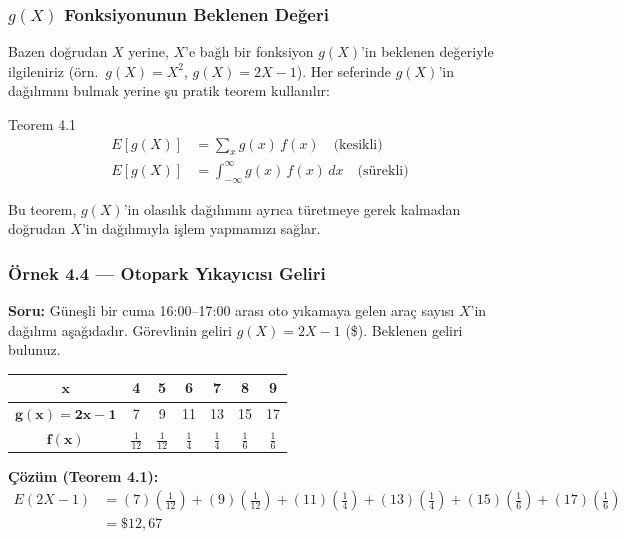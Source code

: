 ﻿\documentclass[light]{lutbeamer}
\begin{document}
\begin{frame}[fragile]
  \frametitle[Teorem 4.1]{$g(X)$ Fonksiyonunun Beklenen Değeri}
  Bazen doğrudan $X$ yerine, $X$'e bağlı bir fonksiyon $g(X)$'in beklenen değeriyle ilgileniriz (örn.\ $g(X) = X^2$, $g(X) = 2X-1$). Her seferinde $g(X)$'in dağılımını bulmak yerine şu pratik teorem kullanılır:
  \begin{center}
    \begin{minipage}{0.9\textwidth}
      \begin{block}{Teorem 4.1}
        {\small
        \begin{align*}
          E[g(X)] &= \sum_x g(x)\, f(x) \quad \text{(kesikli)} \\[4pt]
          E[g(X)] &= \int_{-\infty}^{\infty} g(x)\, f(x) \,dx \quad \text{(sürekli)}
        \end{align*}
        }
      \end{block}
    \end{minipage}
  \end{center}
  Bu teorem, $g(X)$'in olasılık dağılımını ayrıca türetmeye gerek kalmadan doğrudan $X$'in dağılımıyla işlem yapmamızı sağlar.
\end{frame}

\begin{frame}[fragile]
  \frametitle[Örnek 4.4]{Örnek 4.4 --- Otopark Yıkayıcısı Geliri}

  \smallskip
  \textbf{Soru:} Güneşli bir cuma 16:00--17:00 arası oto yıkamaya gelen araç sayısı $X$'in dağılımı aşağıdadır. Görevlinin geliri $g(X) = 2X - 1$ (\$). Beklenen geliri bulunuz.

  {\small
  \begin{center}
    \renewcommand{\arraystretch}{1.2}
    \begin{tabular}{ccccccc}
      \toprule
      $\mathbf{x}$ & 4 & 5 & 6 & 7 & 8 & 9 \\
      \midrule
      $\mathbf{g(x)=2x-1}$ & 7 & 9 & 11 & 13 & 15 & 17 \\
      \midrule
      $\mathbf{f(x)}$ & $\frac{1}{12}$ & $\frac{1}{12}$ & $\frac{1}{4}$ & $\frac{1}{4}$ & $\frac{1}{6}$ & $\frac{1}{6}$ \\
      \bottomrule
    \end{tabular}
  \end{center}
  }

  \textbf{Çözüm (Teorem 4.1):}
  {\small
  \begin{align*}
    E(2X\!-\!1) &= (7)\!\left(\tfrac{1}{12}\right) + (9)\!\left(\tfrac{1}{12}\right) + (11)\!\left(\tfrac{1}{4}\right) + (13)\!\left(\tfrac{1}{4}\right) + (15)\!\left(\tfrac{1}{6}\right) + (17)\!\left(\tfrac{1}{6}\right) \\
                &= \$12{,}67
  \end{align*}
  }
\end{frame}
\end{document}
